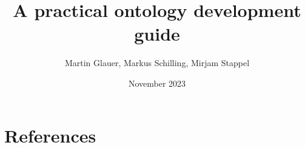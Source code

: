 \documentclass{ol-softwaremanual}
\title{A practical ontology development guide}
\author{Martin Glauer, Markus Schilling, Mirjam Stappel}
\date{November 2023}
\begin{document}
\maketitle

\tableofcontents

\newpage





\section{References}


\end{document}
